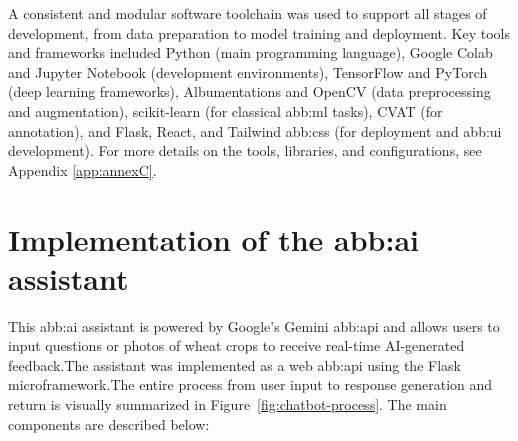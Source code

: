 A consistent and modular software toolchain was used to support all stages of development, from data preparation to model training and deployment. Key tools and frameworks included Python (main programming language), Google Colab and Jupyter Notebook (development environments), TensorFlow and PyTorch (deep learning frameworks), Albumentations and OpenCV (data preprocessing and augmentation), scikit-learn (for classical \gls{abb:ml} tasks), CVAT (for annotation), and Flask, React, and Tailwind \gls{abb:css} (for deployment and \gls{abb:ui} development). For more details on the tools, libraries, and configurations, see Appendix \ref{app:annexC}.


\section{Implementation of the \gls{abb:ai} assistant}

This \gls{abb:ai} assistant is powered by Google's Gemini \gls{abb:api}  and allows users to input questions or photos of wheat crops to receive real-time AI-generated feedback.The assistant was implemented as a web \gls{abb:api}  using the Flask microframework.The entire process from user input to response generation and return is visually summarized in Figure~\ref{fig:chatbot-process}. The main components are described below:

